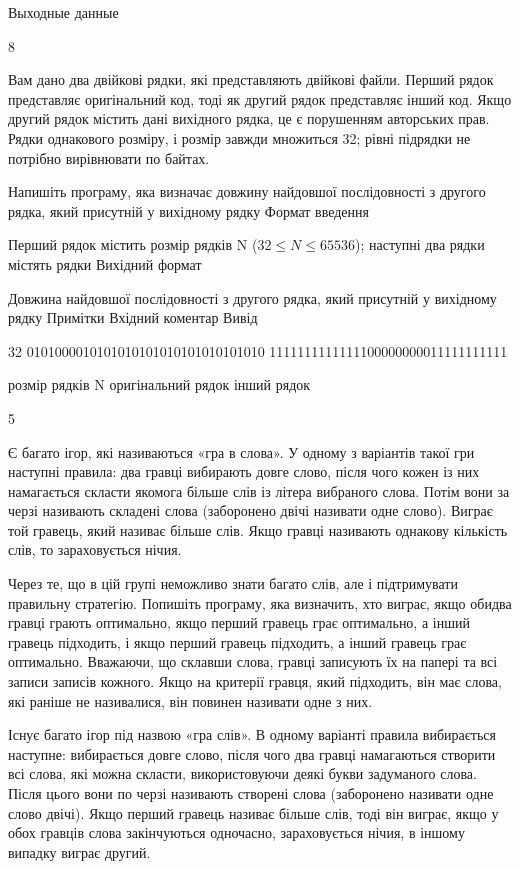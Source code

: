 \documentclass[]{article}
\begin{document}
Выходные данные

8



Вам дано два двійкові рядки, які представляють двійкові файли. Перший рядок представляє оригінальний код, тоді як другий рядок представляє інший код. Якщо другий рядок містить дані вихідного рядка, це є порушенням авторських прав. Рядки однакового розміру, і розмір завжди множиться 32; рівні підрядки не потрібно вирівнювати по байтах.

Напишіть програму, яка визначає довжину найдовшої послідовності з другого рядка, який присутній у вихідному рядку
Формат введення

Перший рядок містить розмір рядків N ($32 \le N \le 65536$); наступні два рядки містять рядки
Вихідний формат

Довжина найдовшої послідовності з другого рядка, який присутній у вихідному рядку
Примітки
Вхідний коментар Вивід

32
0101000010101010101010101010101010
1111111111111100000000011111111111



розмір рядків N
оригінальний рядок
інший рядок



5



Є багато ігор, які називаються «гра в слова». У одному з варіантів такої гри наступні правила: два гравці вибирають довге слово, після чого кожен із них намагається скласти якомога більше слів із літера вибраного слова. Потім вони за черзі називають складені слова (заборонено двічі називати одне слово). Виграє той гравець, який називає більше слів. Якщо гравці називають однакову кількість слів, то зараховується нічия.

Через те, що в цій групі неможливо знати багато слів, але і підтримувати правильну стратегію. Попишіть програму, яка визначить, хто виграє, якщо обидва гравці грають оптимально, якщо перший гравець грає оптимально, а інший гравець підходить, і якщо перший гравець підходить, а інший гравець грає оптимально. Вважаючи, що склавши слова, гравці записують їх на папері та всі записи записів кожного. Якщо на критерії гравця, який підходить, він має слова, які раніше не називалися, він повинен називати одне з них.

Існує багато ігор під назвою «гра слів». В одному варіанті правила вибирається наступне: вибирається довге слово, після чого два гравці намагаються створити всі слова, які можна скласти, використовуючи деякі букви задуманого слова. Після цього вони по черзі називають створені слова (заборонено називати одне слово двічі). Якщо перший гравець називає більше слів, тоді він виграє, якщо у обох гравців слова закінчуються одночасно, зараховується нічия, в іншому випадку виграє другий.
\end{document}

